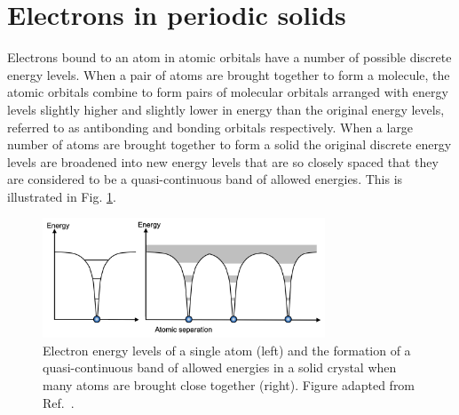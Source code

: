 \documentclass[11pt, twoside]{report}
\begin{document}
\section{Electrons in periodic solids}\label{BandTheorySection}


Electrons bound to an atom in atomic orbitals have a number of possible discrete energy levels. When a pair of atoms are brought together to form a molecule, the atomic orbitals combine to form pairs of molecular orbitals arranged with energy levels slightly higher and slightly lower in energy than the original energy levels, referred to as antibonding and bonding orbitals respectively. When a large number of atoms are brought together to form a solid the 
original discrete energy levels are broadened into new energy levels that are so closely spaced that they are considered to be a quasi-continuous band of allowed energies. This is illustrated in Fig. \ref{band_Elevels}. 

\begin{figure}[h!]
  \centering
    \includegraphics[width=0.75\textwidth]{figures/new_band_Elevels.png}
    \caption[Electron energy levels of a single atom (left) and the formation of a quasi-continuous band of allowed energies in a solid crystal when many atoms are brought close together (right).]{Electron energy levels of a single atom (left) and the formation of a quasi-continuous band of allowed energies in a solid crystal when many atoms are brought close together (right). Figure adapted from Ref.~.}
  \label{band_Elevels}
\end{figure}
\end{document}
